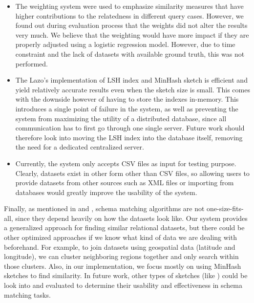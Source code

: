 \begin{itemize}
    \item The weighting system were used to emphasize similarity measures that have higher contributions to the relatedness in different query cases. However, we found out during evaluation process that the weights did not alter the results very much. We believe that the weighting would have more impact if they are properly adjusted using a logistic regression model. However, due to time constraint and the lack of datasets with available ground truth, this was not performed.
    \item The Lazo's implementation of LSH index and MinHash sketch is efficient and yield relatively accurate results even when the sketch size is small. This comes with the downside however of having to store the indexes in-memory. This introduces a single point of failure in the system, as well as preventing the system from maximizing the utility of a distributed database, since all communication has to first go through one single server. Future work should therefore look into moving the LSH index into the database itself, removing the need for a dedicated centralized server.
    \item Currently, the system only accepts CSV files as input for testing purpose. Clearly, datasets exist in other form other than CSV files, so allowing users to provide datasets from other sources such as XML files or importing from databases would greatly improve the usability of the system.
\end{itemize}

Finally, as mentioned in \cite{valentine} and \cite{datasetDiscoverySurvey}, schema matching algorithms are not one-size-fits-all, since they depend heavily on how the datasets look like. Our system provides a generalized approach for finding similar relational datasets, but there could be other optimized approaches if we know what kind of data we are dealing with beforehand. For example, to join datasets using geospatial data (latitude and longitude), we can cluster neighboring regions together and only search within those clusters. Also, in our implementation, we focus mostly on using MinHash sketches to find similarity. In future work, other types of sketches (like \cite{lshBloom}) could be look into and evaluated to determine their usability and effectiveness in schema matching tasks.